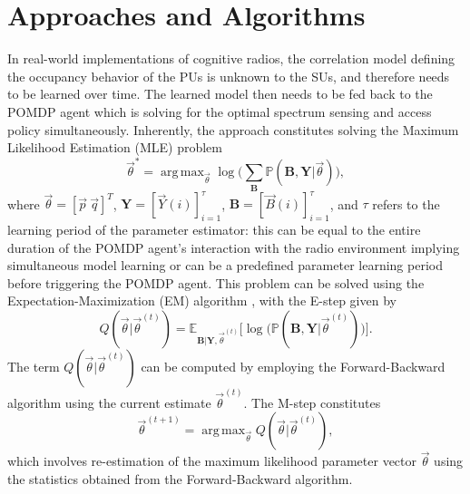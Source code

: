 \documentclass[10pt,twocolumn]{IEEEtran}
\DeclareMathOperator*{\argmax}{arg\,max}
\begin{document}
\section{Approaches and Algorithms}\label{III}
In real-world implementations of cognitive radios, the correlation model defining the occupancy behavior of the PUs is unknown to the SUs, and therefore needs to be learned over time. The learned model then needs to be fed back to the POMDP agent which is solving for the optimal spectrum sensing and access policy simultaneously. Inherently, the approach constitutes solving the Maximum Likelihood Estimation (MLE) problem
\begin{equation}\label{17}
\vec{\theta}^{*} = \argmax_{\vec{\theta}} \log\Big(\sum_{\mathbf{B}} \mathbb{P}(\mathbf{B}, \mathbf{Y}| \vec{\theta})\Big),
\end{equation}
where $\vec{\theta}{=}[\vec{p}\ \vec{q}]^{T}$, $\mathbf{Y}=[\vec{Y}(i)]_{i{=}1}^{\tau}$, $\mathbf{B}=[\vec{B}(i)]_{i{=}1}^{\tau}$,
and $\tau$ refers to the learning period of the parameter estimator: this can be equal to the entire duration of the POMDP agent's interaction with the radio environment implying simultaneous model learning or can be a predefined parameter learning period before triggering the POMDP agent.
This problem can be solved using the Expectation-Maximization (EM) algorithm \cite{778361}, with the E-step given by
\begin{equation}
    Q(\vec{\theta}|\vec{\theta}^{(t)}) = \mathbb{E}_{\mathbf{B}|\mathbf{Y}, \vec{\theta}^{(t)}} \Big[ \log \Big(\mathbb{P}(\mathbf{B}, \mathbf{Y}|\vec{\theta}^{(t)})\Big)\Big].
\end{equation}
The term $Q(\vec{\theta}|\vec{\theta}^{(t)})$ can be computed by employing the Forward-Backward algorithm \cite{778361} using the current estimate $\vec{\theta}^{(t)}$. The M-step constitutes
\begin{equation}
\vec{\theta}^{(t+1)}
 = \argmax_{\vec{\theta}} Q(\vec{\theta}|\vec{\theta}^{(t)}),
\end{equation}
which involves re-estimation of the maximum likelihood parameter vector $\vec{\theta}$ using the statistics obtained from the Forward-Backward algorithm.
\end{document}
